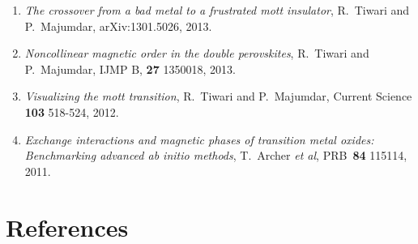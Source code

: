 \documentclass[10pt,a4paper,sans]{moderncv}        %
\begin{document}
\begin{enumerate}
\item %
  \textit{The crossover from a bad metal to a frustrated mott insulator}, R.~Tiwari and P.~Majumdar, arXiv:1301.5026, 2013.
  
\item %
  \textit{Noncollinear magnetic order in the double perovskites}, R.~Tiwari and P.~Majumdar, IJMP B, \textbf{27} 1350018, 2013.

\item %
  \textit{Visualizing the mott transition}, R.~Tiwari and P.~Majumdar, Current Science \textbf{103} 518-524, 2012.
  
\item %
  \textit{Exchange interactions and magnetic phases of transition metal oxides: Benchmarking advanced ab initio methods}, T.~Archer \textit{et al}, PRB~\textbf{84} 115114, 2011.
\end{enumerate}

\vspace{0.5cm}

\section{References}
\begin{cvcolumns}
\end{cvcolumns}


\end{document}

